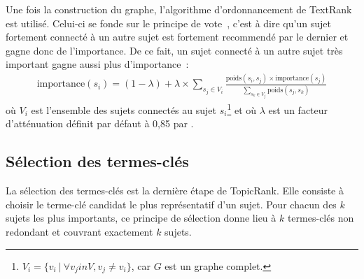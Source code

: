     Une fois la construction du graphe, l'algorithme d'ordonnancement de
    TextRank est utilisé. Celui-ci se fonde sur le principe de \og vote~\fg,
    c'est à dire qu'un sujet fortement connecté à un autre sujet est fortement
    recommendé par le dernier et gagne donc de l'importance. De ce fait, un
    sujet connecté à un autre sujet très important gagne aussi plus
    d'importance~:
    \begin{align}
      \text{importance}(s_i) = (1 - \lambda) + \lambda \times \sum_{s_j \in V_i} \frac{\text{poids}(s_i, s_j) \times \text{importance}(s_j)}{\sum_{s_k \in V_j} \text{poids}(s_j, s_k)} \label{math:textrank}
    \end{align}
    où $V_i$ est l'ensemble des sujets connectés au sujet
    $s_i$\footnote{$V_i = \{v_i\ |\ \forall{v_j in V}, v_j \neq v_i\}$,
    car $G$ est un graphe complet.} et où $\lambda$ est un facteur d'atténuation
    définit par défaut à 0,85 par .

  \subsection{Sélection des termes-clés}
  \label{subsec:selection_des_termes_cles}
    La sélection des termes-clés est la dernière étape de TopicRank. Elle
    consiste à choisir le terme-clé candidat le plus représentatif d'un sujet.
    Pour chacun des $k$ sujets les plus importants, ce principe de sélection
    donne lieu à $k$ termes-clés non redondant et couvrant exactement $k$
    sujets.

